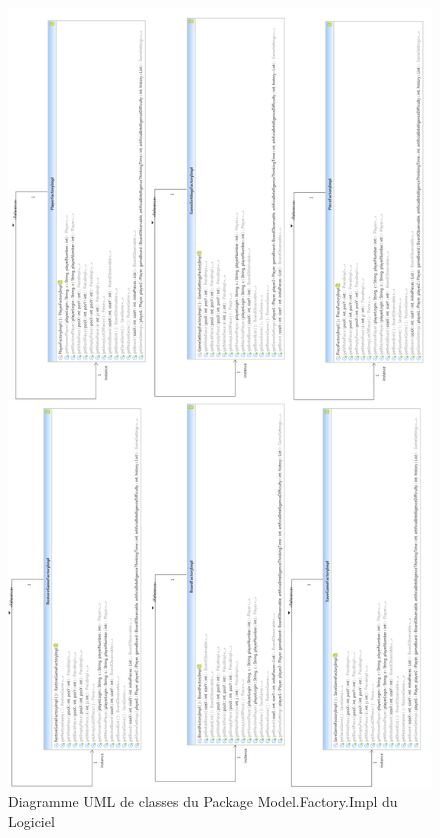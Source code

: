\documentclass[a4paper,12pt]{report}
\begin{document}
\label{OthKerModelFactoryImpl}
\begin{figure}[H]
\centering
 \includegraphics[scale=0.32]{Kernel/Pack_com_model_factory_impl.png}
\caption{Diagramme UML de classes du Package Model.Factory.Impl du Logiciel}
\end{figure}
\end{document}
